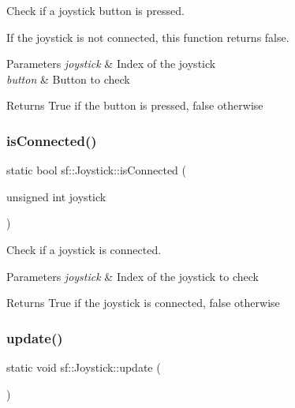 Check if a joystick button is pressed. 

If the joystick is not connected, this function returns false.


\begin{DoxyParams}{Parameters}
{\em joystick} & Index of the joystick \\
\hline
{\em button} & Button to check\\
\hline
\end{DoxyParams}
\begin{DoxyReturn}{Returns}
True if the button is pressed, false otherwise 
\end{DoxyReturn}
\mbox{\label{classsf_1_1_joystick_ac7d4e1923e9f9420174f26703ea63d6c}} 
\subsubsection{\texorpdfstring{is\+Connected()}{isConnected()}}
{\footnotesize\ttfamily static bool sf\+::\+Joystick\+::is\+Connected (\begin{DoxyParamCaption}\item[{unsigned int}]{joystick }\end{DoxyParamCaption})\hspace{0.3cm}{\ttfamily [static]}}



Check if a joystick is connected. 


\begin{DoxyParams}{Parameters}
{\em joystick} & Index of the joystick to check\\
\hline
\end{DoxyParams}
\begin{DoxyReturn}{Returns}
True if the joystick is connected, false otherwise 
\end{DoxyReturn}
\mbox{\label{classsf_1_1_joystick_ab85fa9175b4edd3e5a07ee3cde0b0f48}} 
\subsubsection{\texorpdfstring{update()}{update()}}
{\footnotesize\ttfamily static void sf\+::\+Joystick\+::update (\begin{DoxyParamCaption}{ }\end{DoxyParamCaption})\hspace{0.3cm}{\ttfamily [static]}}



